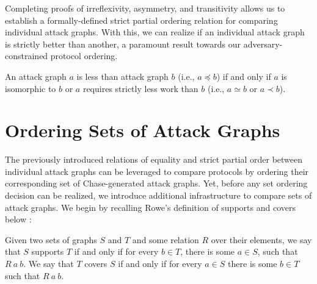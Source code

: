 \documentclass[runningheads]{llncs}
\theoremstyle{definition}
\begin{document}

Completing proofs of irreflexivity, asymmetry, and transitivity allows us to establish a formally-defined strict partial ordering relation for comparing individual attack graphs. With this, we can realize if an individual attack graph is strictly better than another, a paramount result towards our adversary-constrained protocol ordering.


\begin{definition}
  An attack graph $a$ is less than attack graph $b$ (i.e., $a \preceq b$) if and only if $a$ is isomorphic to $b$ or $a$ requires strictly less work than $b$ (i.e., $a \simeq b$ or $a \prec b$).
\end{definition}


\section{Ordering Sets of Attack Graphs}

The previously introduced relations of equality and strict partial order between individual attack graphs can be leveraged to compare protocols by ordering their corresponding set of Chase-generated attack graphs. Yet, before any set ordering decision can be realized, we introduce additional infrastructure to compare sets of attack graphs. We begin by recalling Rowe's definition of supports and covers below \cite{Rowe:2021:OnOrdering}:

\begin{definition}
    Given two sets of graphs $S$ and $T$ and some relation $R$ over their elements, we say that $S$ supports $T$ if and only if for every $b \in T$, there is some $a \in S$, such that $R\: a\: b$. We  say that $T$ covers $S$ if and only if for every $a \in S$ there is some $b \in T$ such that $R\: a\: b$.
\end{definition}
\end{document}
